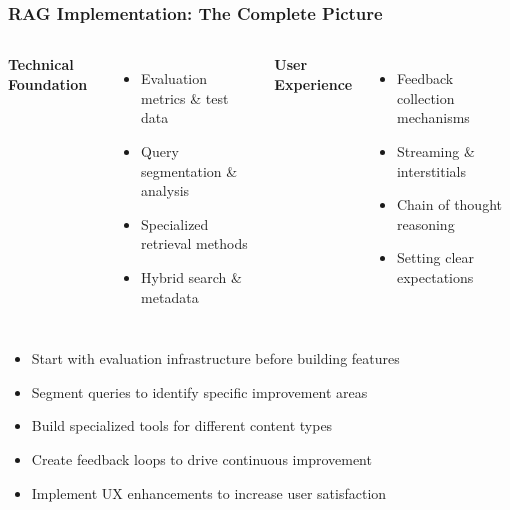 \begin{frame}
    \frametitle{RAG Implementation: The Complete Picture}
    
    \begin{center}
    \end{center}
    
    \begin{columns}
        \textbf{Technical Foundation}
        \begin{itemize}
            \item Evaluation metrics \& test data
            \item Query segmentation \& analysis
            \item Specialized retrieval methods
            \item Hybrid search \& metadata
        \end{itemize}
        
        \textbf{User Experience}
        \begin{itemize}
            \item Feedback collection mechanisms
            \item Streaming \& interstitials
            \item Chain of thought reasoning
            \item Setting clear expectations
        \end{itemize}
    \end{columns}
    
    \vspace{0.3cm}
    \begin{center}
        
        \begin{itemize}
            \item Start with evaluation infrastructure before building features
            \item Segment queries to identify specific improvement areas
            \item Build specialized tools for different content types
            \item Create feedback loops to drive continuous improvement
            \item Implement UX enhancements to increase user satisfaction
        \end{itemize}
    \end{center}
\end{frame} 

